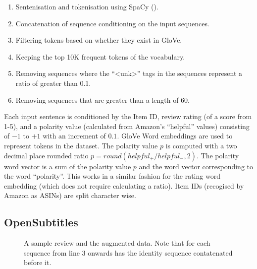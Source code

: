 \documentclass[12pt,twoside]{report}
\begin{document}

\begin{enumerate}  
	\item Sentenisation and tokenisation using SpaCy (\cite{honnibal_spacy_2017}).
	\item Concatenation of sequence conditioning on the input sequences.
	\item Filtering tokens based on whether they exist in GloVe.
	\item Keeping the top 10K frequent tokens of the vocabulary.
	\item Removing sequences where the ``\textless{}unk\textgreater'' tags in the sequences represent a ratio of greater than 0.1.
	\item Removing sequences that are greater than a length of 60. 
\end{enumerate}

Each input sentence is conditioned by the Item ID, review rating (of a score from 1-5), and a polarity value (calculated from Amazon's ``helpful'' values) consisting of $-1$ to $+1$ with an increment of $0.1$. GloVe Word embeddings are used to represent tokens in the dataset. The polarity value  $p$ is computed with a two decimal place rounded ratio $p=round(helpful_{+}/helpful_{-},2)$. The polarity word vector is a sum of the polarity value $p$ and the word vector corresponding to the word ``polarity''. This works in a similar fashion for the rating word embedding (which does not require calculating a ratio). Item IDs (recogised by Amazon as ASINs) are split character wise.

\subsection{OpenSubtitles}

\begin{figure}[!ht]
	\centering
	
	\caption{A sample review and the augmented data. Note that for each sequence from line 3 onwards has the identity sequence contatenated before it. \label{ex_dataset:subs}}
	\end{figure}
\end{document}
